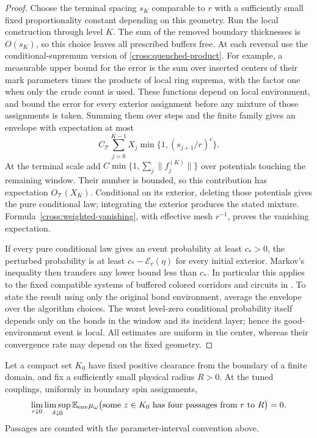 \begin{proof}
Choose the terminal spacing $s_K$ comparable to $r$ with a sufficiently
small fixed proportionality constant depending on this geometry.
Run the local construction through level $K$.  The sum of the removed
boundary thicknesses is $O(s_K)$, so this choice leaves all prescribed
buffers free.  At each reversal use the conditional-supremum version
of \eqref{cross:quenched-product}.  For example, a measurable upper
bound for the error is the sum over inserted centers of their mark
parameters times the products of local ring suprema, with the factor
one when only the crude count is used.  These functions depend on
local environment, and bound the error for every exterior assignment
before any mixture of those assignments is taken.  Summing them over
steps and the finite family gives an envelope with expectation at most
\[
 C_{\mathcal T}\sum_{j=0}^{K-1}X_j
       \min\{1,(s_{j+1}/r)^c\}.
\]
At the terminal scale add
$C\min\{1,\sum_j\|f_j^{(K)}\|\}$ over potentials touching the remaining
window.  Their number is bounded, so this contribution has expectation
$O_{\mathcal T}(X_K)$.  Conditional on its exterior, deleting those
potentials gives the pure conditional law; integrating the exterior
produces the stated mixture.  Formula~\eqref{cross:weighted-vanishing},
with effective mesh $r^{-1}$, proves the vanishing expectation.

If every pure conditional law gives an event probability at least
$c_*>0$, the perturbed probability is at least
$c_*-\mathcal E_r(\eta)$ for every initial exterior.  Markov's inequality
then transfers any lower bound less than $c_*$.  In particular this
applies to the fixed compatible systems of buffered colored corridors
and circuits in \cite[Section~2, Proposition ``Pure buffered RSW
consequences'']{S}.  To state the result using only the original bond
environment, average the envelope over the algorithm choices.  The
worst level-zero conditional probability itself depends only on the
bonds in the window and its incident layer; hence its good-environment
event is local.  All estimates are uniform in the center, whereas their
convergence rate may depend on the fixed geometry.
\end{proof}

\begin{corollary}
\label{cross:four-passages}
Let a compact set $K_0$ have fixed positive clearance from the boundary
of a finite domain, and fix a sufficiently small physical radius $R>0$.
At the tuned couplings, uniformly in boundary spin assignments,
\begin{equation}
 \lim_{r\downarrow0}\limsup_{\delta\downarrow0}
 \mathbb E_{\rm env}\mu_\omega\bigl(
   \text{some }z\in K_0\text{ has four passages from }r\text{ to }R
                              \bigr)=0.
 \label{cross:four-passages-limit}
\end{equation}
Passages are counted with the parameter-interval convention above.
\end{corollary}

